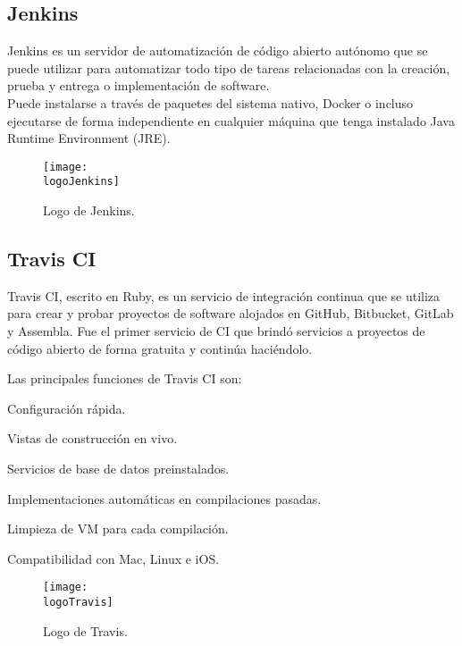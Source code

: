 \subsection{Jenkins}
Jenkins es un servidor de automatización de código abierto autónomo que se puede utilizar para automatizar todo tipo de tareas relacionadas con la creación, prueba y entrega o implementación de software.\\
Puede instalarse a través de paquetes del sistema nativo, Docker o incluso ejecutarse de forma independiente en cualquier máquina que tenga instalado Java Runtime Environment (JRE).

\begin{figure}[h]
    \centering
    \texttt{[image: \\logoJenkins]}
    \caption{Logo de Jenkins.}
\end{figure}

\subsection{Travis CI}
Travis CI, escrito en Ruby, es un servicio de integración continua que se utiliza para crear y probar proyectos de software alojados en GitHub, Bitbucket, GitLab y Assembla. Fue el primer servicio de CI que brindó servicios a proyectos de código abierto de forma gratuita y continúa haciéndolo.

Las principales funciones de Travis CI son:
\begin{compactitem}
    \item Configuración rápida.
    \item Vistas de construcción en vivo.
    \item Servicios de base de datos preinstalados.
    \item Implementaciones automáticas en compilaciones pasadas.
    \item Limpieza de VM para cada compilación.
    \item Compatibilidad con Mac, Linux e iOS.
\end{compactitem}

\begin{figure}[h]
    \centering
    \texttt{[image: \\logoTravis]}
    \caption{Logo de Travis.}
\end{figure}

